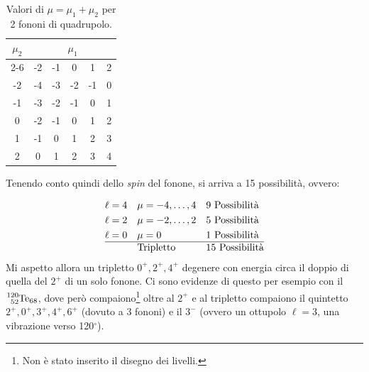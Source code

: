 \begin{table}[!h]
    \centering
    \begin{tabular}{|c|ccccc|}
        \hline
        \multirow{3}{*}{$\mu_2$} & \multicolumn{5}{c|}{$\mu_1$} \\
        \cline{2-6}
         & -2 & -1 & 0 & 1 & 2 \\
        \hline
        -2 & -4 & -3 & -2 & -1 & 0 \\
        -1 & -3 & -2 & -1 & 0 & 1 \\
        0 & -2 & -1 & 0 & 1 & 2 \\
        1 & -1 & 0 & 1 & 2 & 3 \\
        2 & 0 & 1 & 2 & 3 & 4 \\
        \hline
    \end{tabular}
    \caption{Valori di $\mu=\mu_1+\mu_2$ per 2 fononi di quadrupolo.}
    \label{mumu}
\end{table}
\noindent Tenendo conto quindi dello \textit{spin} del fonone, si arriva a 15 possibilità, ovvero:

\begin{displaymath}
\begin{aligned}
&\ell = 4 & &\mu=-4,\dots,4 & &9 \text{ Possibilità} \\
&\ell = 2 & &\mu=-2,\dots,2 & &5 \text{ Possibilità} \\
&\ell = 0 & &\mu=0 & &1 \text{ Possibilità}\\ 
\hline
& & &\text{Tripletto} & &15 \text{ Possibilità} 
\end{aligned}
\end{displaymath}
\noindent Mi aspetto allora un tripletto $0^+,2^+,4^+$ degenere con energia circa il doppio di quella del $2^+$ di un solo fonone. Ci sono evidenze di questo per esempio con il $\ce{^{120}_{52}Te_{68}}$, dove però compaiono\footnote{Non è stato inserito il disegno dei livelli.} oltre al $2^+$ e al tripletto compaiono il quintetto $2^+,0^+,3^+,4^+,6^+$ (dovuto a 3 fononi) e il $3^-$ (ovvero un ottupolo $\ell=3$, una vibrazione verso 120$^\circ$).

